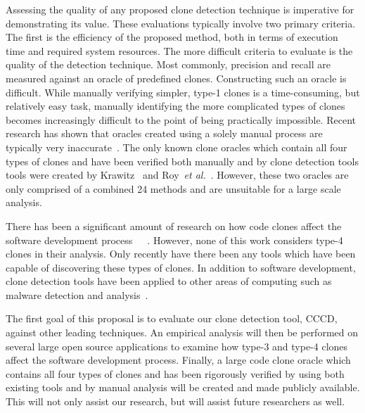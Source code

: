\documentclass{article}
\begin{document}
Assessing the quality of any proposed clone detection technique is imperative for demonstrating its value. These evaluations typically involve two primary criteria. The first is the efficiency of the proposed method, both in terms of execution time and required system resources. The more difficult criteria to evaluate is the quality of the detection technique. Most commonly, precision and recall are measured against an oracle of predefined clones. Constructing such an oracle is difficult. While manually verifying simpler, type-1 clones is a time-consuming, but relatively easy task, manually identifying the more complicated types of clones becomes increasingly difficult to the point of being practically impossible. Recent research has shown that oracles created using a solely manual process are typically very inaccurate~\cite{Walenstein:2003:PCT:950792.951349}. The only known clone oracles which contain all four types of clones and have been verified both manually and by clone detection tools tools were created by Krawitz~\cite{Kraw2012} and Roy~\emph{et al.}~\cite{Roy:2009:CEC:1530898.1531101}. However, these two oracles are only comprised of a combined 24 methods and are unsuitable for a large scale analysis.  

There has been a significant amount of research on how code clones affect the software development process~\cite{Juergens:2009:CCM:1555001.1555062}~\cite{Gode:2009:ETC:1637859.1638008}~\cite{Saha:2013:UET:2487085.2487117}. However, none of this work considers type-4 clones in their analysis. Only recently have there been any tools which have been capable of discovering these types of clones. In addition to software development, clone detection tools have been applied to other areas of computing such as malware detection and analysis~\cite{Saebjornsen:2009:DCC:1572272.1572287}.


The first goal of this proposal is to evaluate our clone detection tool, CCCD, against other leading techniques. An empirical analysis will then be performed on several large open source applications to examine how type-3 and type-4 clones affect the software development process. Finally, a large code clone oracle which contains all four types of clones and has been rigorously verified by using both existing tools and by manual analysis will be created and made publicly available. This will not only assist our research, but will assist future researchers as well.


% 
\end{document}
